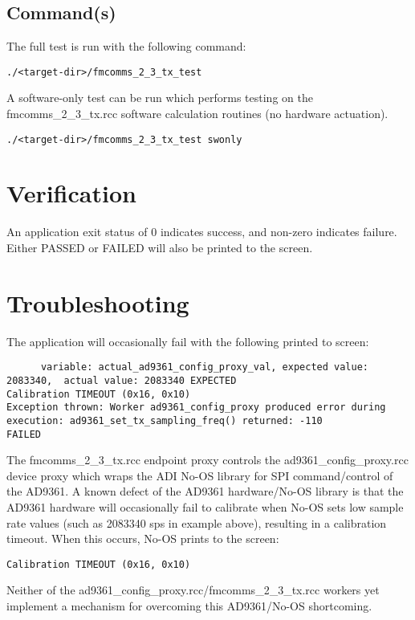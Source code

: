 \subsection{Command(s)}
The full test is run with the following command:
\begin{lstlisting}
./<target-dir>/fmcomms_2_3_tx_test
\end{lstlisting}
A software-only test can be run which performs testing on the fmcomms\_2\_3\_tx.rcc software calculation routines (no hardware actuation).
\begin{lstlisting}
./<target-dir>/fmcomms_2_3_tx_test swonly
\end{lstlisting}
\section{Verification}
An application exit status of 0 indicates success, and non-zero indicates failure. Either PASSED or FAILED will also be printed to the screen.

\section{Troubleshooting}
The application will occasionally fail with the following printed to screen:
\begin{lstlisting}
      variable: actual_ad9361_config_proxy_val, expected value: 2083340,  actual value: 2083340 EXPECTED
Calibration TIMEOUT (0x16, 0x10)
Exception thrown: Worker ad9361_config_proxy produced error during execution: ad9361_set_tx_sampling_freq() returned: -110
FAILED
\end{lstlisting}
The fmcomms\_2\_3\_tx.rcc endpoint proxy controls the ad9361\_config\_proxy.rcc device proxy which wraps the ADI No-OS library for SPI command/control of the AD9361. A known defect of the AD9361 hardware/No-OS library is that the AD9361 hardware will occasionally fail to calibrate when No-OS sets low sample rate values (such as 2083340 sps in example above), resulting in a calibration timeout. When this occurs, No-OS prints to the screen:
\begin{lstlisting}
Calibration TIMEOUT (0x16, 0x10)
\end{lstlisting}
Neither of the ad9361\_config\_proxy.rcc/fmcomms\_2\_3\_tx.rcc workers yet implement a mechanism for overcoming this AD9361/No-OS shortcoming.



